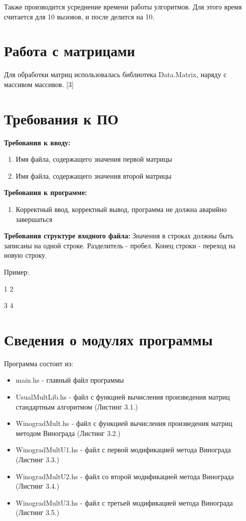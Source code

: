 \documentclass[12pt]{report}
\begin{document}
Также производится усреднение времени работы улгоритмов. Для этого время считается для 10 вызовов, и после делится на 10.

\section{Работа с матрицами}
Для обработки матриц использовалась библиотека Data.Matrix, наряду с массивом массивов. [3]

\section{Требования к ПО}

\textbf{Требования к вводу:}
\begin{enumerate}
	\item Имя файла, содержащего значения первой матрицы
	\item Имя файла, содержащего значения второй матрицы
\end{enumerate}
\textbf{Требования к программе:}
\begin{enumerate}
  	\item Корректный ввод, корректный вывод, программа не должна аварийно завершаться
\end{enumerate}

\textbf{Требования структуре входного файла:}
	Значения в строках должны быть записаны на одной строке. Разделитель - пробел. Конец строки - переход на новую строку.
	
	Пример:
\begin{center}
	1 2

	3 4
\end{center}

\section{Сведения о модулях программы}
Программа состоит из:
\begin{itemize}
	\item main.hs - главный файл программы
	\item UsualMultLib.hs - файл с функцией вычисления произведения матриц стандартным алгоритмом (Листинг 3.1.)
	\item WinogradMult.hs - файл с функцией вычисления произведения матриц методом Винограда (Листинг 3.2.)
	\item WinogradMultU1.hs - файл с первой модификацией метода Винограда (Листинг 3.3.)
	\item WinogradMultU2.hs - файл со второй модификацией метода Винограда (Листинг 3.4.)
	\item WinogradMultU3.hs - файл с третьей модификацией метода Винограда (Листинг 3.5.)
\end{itemize}
\end{document}
